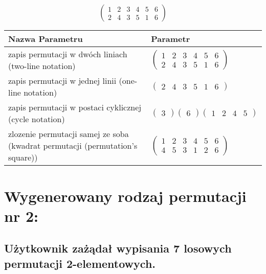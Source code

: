 \documentclass[12pt]{article}
\begin{document}
\subsection{}
\begin{center}
\[
\begin{pmatrix}
	1 & 2 & 3 & 4 & 5 & 6 \\ 
	2 & 4 & 3 & 5 & 1 & 6 
\end{pmatrix}
\]

\begin{tabular}{|m{0.6\linewidth}|m{0.4\linewidth}|}
	\hline
	Nazwa Parametru & Parametr \\
	\hline
	zapis permutacji w dwóch liniach (two-line notation) & $\begin{pmatrix} 1 & 2 & 3 & 4 & 5 & 6 \\ 
2 & 4 & 3 & 5 & 1 & 6 \end{pmatrix}$ \\ 
	\hline
	zapis permutacji w jednej linii (one-line notation) & $\begin{pmatrix} 2 & 4 & 3 & 5 & 1 & 6 \end{pmatrix}$ \\ 
	\hline
	zapis permutacji w postaci cyklicznej (cycle notation) & $\begin{pmatrix} 3 \end{pmatrix} \begin{pmatrix} 6 \end{pmatrix} \begin{pmatrix} 1 & 2 & 4 & 5 \end{pmatrix} $ \\ 
	\hline
	zlozenie permutacji samej ze soba (kwadrat permutacji (permutation's square)) & $\begin{pmatrix} 1 & 2 & 3 & 4 & 5 & 6 \\ 
4 & 5 & 3 & 1 & 2 & 6 \end{pmatrix}$ \\ 
	\hline
\end{tabular}
\end{center}


\section{Wygenerowany rodzaj permutacji nr 2:}
\subsection*{Użytkownik zażądał wypisania 7 losowych permutacji 2-elementowych.}
\end{document}
